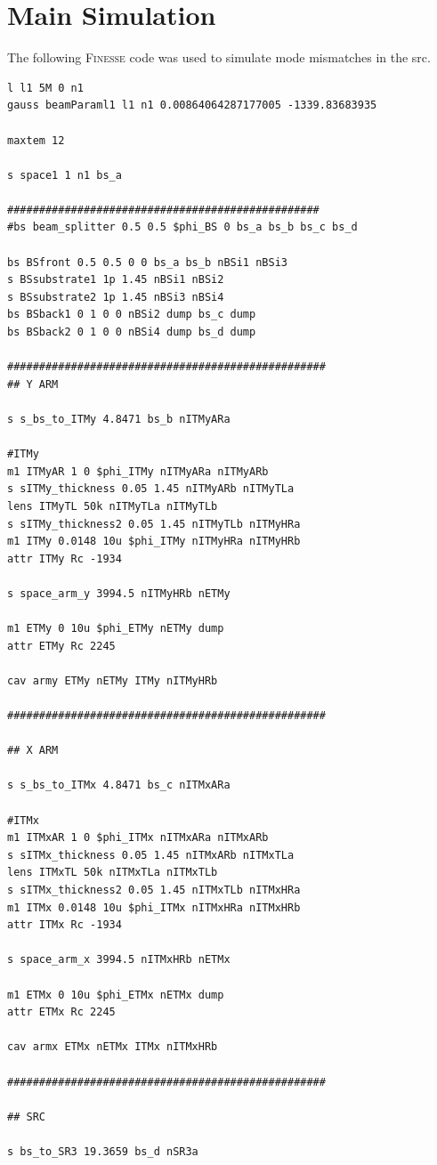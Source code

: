 \section{Main Simulation}
\label{sec:finesse_code}
The following \textsc{Finesse} code was used to simulate mode mismatches in the \gls{src}.
\begin{lstlisting}[breaklines]
l l1 5M 0 n1
gauss beamParaml1 l1 n1 0.00864064287177005 -1339.83683935 

maxtem 12

s space1 1 n1 bs_a

#################################################
#bs beam_splitter 0.5 0.5 $phi_BS 0 bs_a bs_b bs_c bs_d

bs BSfront 0.5 0.5 0 0 bs_a bs_b nBSi1 nBSi3
s BSsubstrate1 1p 1.45 nBSi1 nBSi2
s BSsubstrate2 1p 1.45 nBSi3 nBSi4
bs BSback1 0 1 0 0 nBSi2 dump bs_c dump
bs BSback2 0 1 0 0 nBSi4 dump bs_d dump

##################################################
## Y ARM

s s_bs_to_ITMy 4.8471 bs_b nITMyARa

#ITMy
m1 ITMyAR 1 0 $phi_ITMy nITMyARa nITMyARb
s sITMy_thickness 0.05 1.45 nITMyARb nITMyTLa
lens ITMyTL 50k nITMyTLa nITMyTLb
s sITMy_thickness2 0.05 1.45 nITMyTLb nITMyHRa
m1 ITMy 0.0148 10u $phi_ITMy nITMyHRa nITMyHRb
attr ITMy Rc -1934

s space_arm_y 3994.5 nITMyHRb nETMy 

m1 ETMy 0 10u $phi_ETMy nETMy dump
attr ETMy Rc 2245

cav army ETMy nETMy ITMy nITMyHRb

##################################################

## X ARM

s s_bs_to_ITMx 4.8471 bs_c nITMxARa

#ITMx
m1 ITMxAR 1 0 $phi_ITMx nITMxARa nITMxARb
s sITMx_thickness 0.05 1.45 nITMxARb nITMxTLa
lens ITMxTL 50k nITMxTLa nITMxTLb
s sITMx_thickness2 0.05 1.45 nITMxTLb nITMxHRa
m1 ITMx 0.0148 10u $phi_ITMx nITMxHRa nITMxHRb
attr ITMx Rc -1934

s space_arm_x 3994.5 nITMxHRb nETMx

m1 ETMx 0 10u $phi_ETMx nETMx dump
attr ETMx Rc 2245

cav armx ETMx nETMx ITMx nITMxHRb

##################################################

## SRC 

s bs_to_SR3 19.3659 bs_d nSR3a


\end{lstlisting}
